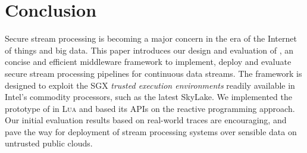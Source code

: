 \section{Conclusion}\label{sec:conclusion}
Secure stream processing is becoming a major concern in the era of the Internet of things and big data.
This paper introduces our design and evaluation of \SYS{}, an concise and efficient middleware framework to implement, deploy and evaluate secure stream processing pipelines for continuous data streams.
The framework is designed to exploit the SGX \emph{trusted execution environments} readily available in Intel's commodity processors, such as the latest SkyLake.
We implemented the prototype of \SYS{} in \textsc{Lua} and based its APIs on the reactive programming approach.
Our initial evaluation results based on real-world traces are encouraging, and pave the way for deployment of stream processing systems over sensible data on untrusted public clouds.
% 
